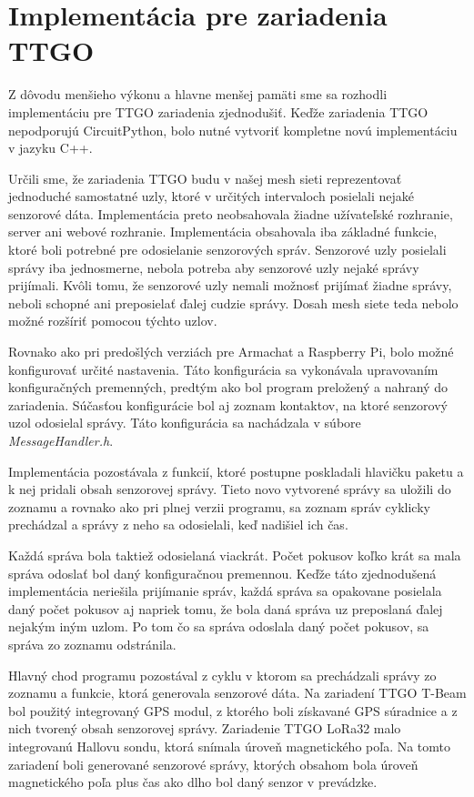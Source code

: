 \documentclass[slovak,master]{diploma}
\begin{document}
\section{Implementácia pre zariadenia TTGO}
Z dôvodu menšieho výkonu a hlavne menšej pamäti sme sa rozhodli implementáciu pre TTGO zariadenia zjednodušiť. Keďže zariadenia TTGO nepodporujú 
CircuitPython, bolo nutné vytvoriť kompletne novú implementáciu v jazyku C++.

Určili sme, že zariadenia TTGO budu v našej mesh sieti reprezentovať jednoduché samostatné uzly, ktoré v určitých intervaloch posielali nejaké senzorové dáta. Implementácia preto 
neobsahovala žiadne užívateľské rozhranie, server ani webové rozhranie. Implementácia obsahovala iba základné funkcie, ktoré boli potrebné pre 
odosielanie senzorových správ. Senzorové uzly posielali správy iba jednosmerne, nebola potreba aby senzorové uzly nejaké správy prijímali. 
Kvôli tomu, že senzorové uzly nemali možnosť prijímať žiadne správy, neboli schopné ani preposielať ďalej cudzie správy. Dosah mesh siete teda nebolo možné 
rozšíriť pomocou týchto uzlov.

Rovnako ako pri predošlých verziách pre Armachat a Raspberry Pi, bolo možné konfigurovať určité nastavenia. Táto konfigurácia sa vykonávala upravovaním konfiguračných 
premenných, predtým ako bol program preložený a nahraný do zariadenia. Súčasťou konfigurácie bol aj zoznam kontaktov, na ktoré senzorový uzol odosielal správy. 
Táto konfigurácia sa nachádzala v súbore \emph{MessageHandler.h}.

Implementácia pozostávala z funkcií, ktoré postupne poskladali hlavičku paketu a k nej pridali obsah senzorovej správy. Tieto novo vytvorené správy sa uložili do zoznamu 
a rovnako ako pri plnej verzii programu, sa zoznam správ cyklicky prechádzal a správy z neho sa odosielali, keď nadišiel ich čas.

Každá správa bola taktiež odosielaná viackrát. Počet pokusov koľko krát sa mala správa odoslať bol daný konfiguračnou premennou. Keďže táto zjednodušená implementácia neriešila prijímanie správ, 
každá správa sa opakovane posielala daný počet pokusov aj napriek tomu, že bola daná správa uz preposlaná ďalej nejakým iným uzlom. Po tom čo sa správa odoslala 
daný počet pokusov, sa správa zo zoznamu odstránila.

Hlavný chod programu pozostával z cyklu v ktorom sa prechádzali správy zo zoznamu a funkcie, ktorá generovala senzorové dáta. Na zariadení TTGO T-Beam bol použitý integrovaný 
GPS modul, z ktorého boli získavané GPS súradnice a z nich tvorený obsah senzorovej správy. Zariadenie TTGO LoRa32 malo integrovanú Hallovu sondu, ktorá snímala 
úroveň magnetického poľa. Na tomto zariadení boli generované senzorové správy, ktorých obsahom bola úroveň magnetického poľa plus čas ako dlho bol daný senzor v prevádzke.
\end{document}
